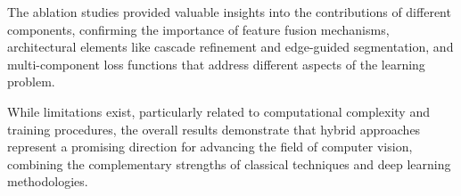 The ablation studies provided valuable insights into the contributions of different components, confirming the importance of feature fusion mechanisms, architectural elements like cascade refinement and edge-guided segmentation, and multi-component loss functions that address different aspects of the learning problem.

While limitations exist, particularly related to computational complexity and training procedures, the overall results demonstrate that hybrid approaches represent a promising direction for advancing the field of computer vision, combining the complementary strengths of classical techniques and deep learning methodologies.